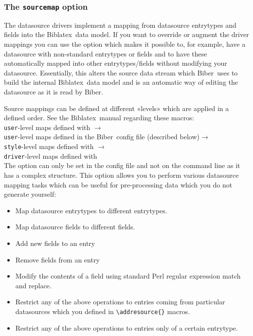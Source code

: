\documentclass{ltxdockit}
\newcommand*{\biber}{Biber\xspace}
\newcommand*{\biblatex}{Biblatex\xspace}
\begin{document}
\subsubsection{The \texttt{sourcemap} option}\label{ref:map}

The datasource drivers implement a mapping from datasource
entrytypes and fields into the \biblatex\ data model. If you want to
override or augment the driver mappings you can use the
 option which makes it possible to, for example, have a
datasource with non-standard entrytypes or fields and to have these
automatically mapped into other entrytypes/fields without modifying
your datasource.  Essentially, this alters the source data stream
which \biber\ uses to build the internal \biblatex\ data model and is an
automatic way of editing the datasource as it is read by \biber.

Source mappings can be defined at different «levels» which are applied
in a defined order. See the \biblatex\ manual regarding these macros:\\[2ex]

\noindent \texttt{user}-level maps defined with $\rightarrow$\\
\hspace*{1em}\texttt{user}-level maps defined in the \biber\ config file (described below)$\rightarrow$\\
\hspace*{2em}\texttt{style}-level maps defined with $\rightarrow$\\
\hspace*{3em}\texttt{driver}-level maps defined with \\[2ex]

The  option can only be set in the config file
and not on the command line as it has a complex structure. This
option allows you to perform various datasource mapping
tasks which can be useful for pre-processing data which you do not
generate yourself:

\begin{itemize}
\item Map datasource entrytypes to different entrytypes.
\item Map datasource fields to different fields.
\item Add new fields to an entry
\item Remove fields from an entry
\item Modify the contents of a field using standard Perl regular expression
  match and replace.
\item Restrict any of the above operations to entries coming from
  particular datasources which you defined in \verb+\addresource{}+ macros.
\item Restrict any of the above operations to entries only of a certain
  entrytype.
\end{itemize}
\end{document}
